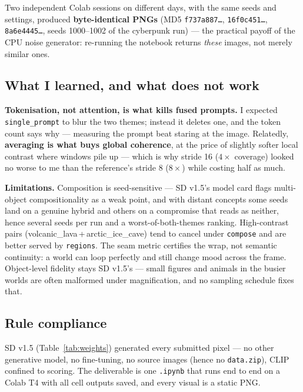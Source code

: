 \documentclass[10pt,a4paper,twocolumn]{article}
\newcommand{\tw}[1]{\texttt{\footnotesize #1}}
\newcommand{\thm}[1]{{\footnotesize\textsf{#1}}}
\begin{document}
Two independent Colab sessions on different days, with the same seeds and
settings, produced \textbf{byte-identical PNGs} (MD5 \tw{f737a887\dots},
\tw{16f0c451\dots}, \tw{8a6e4445\dots}, seeds 1000--1002 of the \thm{cyberpunk}
run) --- the practical payoff of the CPU noise generator: re-running the notebook
returns \emph{these} images, not merely similar ones.

\subsection{What I learned, and what does not work}

\textbf{Tokenisation, not attention, is what kills fused prompts.} I expected
\tw{single\_prompt} to blur the two themes; instead it deletes one, and the token
count says why --- measuring the prompt beat staring at the image. Relatedly,
\textbf{averaging is what buys global coherence}, at the price of slightly softer
local contrast where windows pile up --- which is why stride 16 ($4\times$
coverage) looked no worse to me than the reference's stride 8 ($8\times$) while
costing half as much.

\textbf{Limitations.} Composition is seed-sensitive --- SD v1.5's model card flags
multi-object compositionality as a weak point, and with distant concepts some
seeds land on a genuine hybrid and others on a compromise that reads as neither,
hence several seeds per run and a worst-of-both-themes ranking. High-contrast
pairs (\thm{volcanic\_lava\,+\,arctic\_ice\_cave}) tend to cancel under \tw{compose}
and are better served by \tw{regions}. The seam metric certifies the wrap, not
semantic continuity: a world can loop perfectly and still change mood across the
frame. Object-level fidelity stays SD v1.5's --- small figures and animals in the
busier worlds are often malformed under magnification, and no sampling schedule
fixes that.

\subsection{Rule compliance}

SD v1.5 (Table~\ref{tab:weights}) generated every submitted pixel --- no other
generative model, no fine-tuning, no source images (hence no \tw{data.zip}), CLIP
confined to scoring. The deliverable is one \tw{.ipynb} that runs end to
end on a Colab T4 with all cell outputs saved, and every visual is a static PNG.
\end{document}
